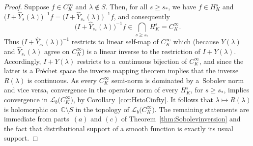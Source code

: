 \documentclass[11pt]{article}
\numberwithin{equation}{section}
\numberwithin{equation}{section}
\newcommand{\CC}{{\mathbb C}}
\newcommand{\LL}{{\mathcal L}}
\begin{document}
 \begin{proof}
 	Suppose $f\in C^\infty_K$ and $\lambda\notin S$. Then, for all $s\ge s_*$,
 	we have	$f\in H^s_K$ and $\big(I+ \hat{Y}_{s}(\lambda)\big)^{-1}f=\big(I+\hat{Y}_{s_*}(\lambda)\big)^{-1}f$, and consequently
 	\begin{equation*}
 		\big(I+\hat{Y}_{s_*}(\lambda)\big)^{-1}f\in \bigcap_{s\ge s_*} H^s_K = C^\infty_K.
 	\end{equation*}
 	Thus $\big(I+\hat{Y}_{s_*}(\lambda)\big)^{-1}$ restricts to linear self-map of $C^\infty_K$ which
 	\big(because $Y(\lambda)$ and $\hat{Y}_{s_*}(\lambda)$ agree on $C^\infty_K$\big) is a linear inverse to the restriction of $I+ Y(\lambda)$. Accordingly, $I+ Y(\lambda)$ restricts to a~continuous bijection of $C^\infty_K$, and since the latter is a Fr\'echet space the inverse mapping theorem implies that the inverse $R(\lambda)$ is continuous.
 	As every $C^\infty_K$ semi-norm is dominated by a~Sobolev norm and
 	vice versa, convergence in the operator norm of every $H^s_K$, for $s\ge s_*$,
 	implies convergence in $\LL_b\big(C^\infty_K\big)$, by Corollary~\ref{cor:HstoCinfty}. It follows that $\lambda\mapsto R(\lambda)$ is holomorphic on~$\CC\setminus S$ in the topology of $\LL_b\big(C^\infty_K\big)$.
 	The remaining statements are immediate from parts~$(a)$ and $(c)$ of Theorem~\ref{thm:Sobolevinversion} and the fact that distributional support of a smooth function is exactly its usual support.
 \end{proof}
\end{document}
